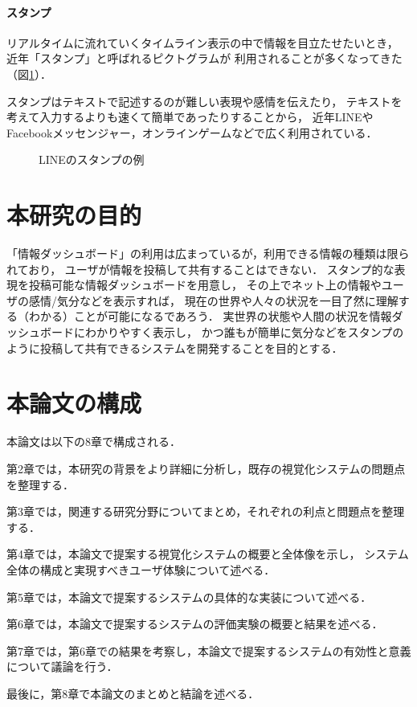 \vspace{2mm}
\paragraph*{スタンプ}

リアルタイムに流れていくタイムライン表示の中で情報を目立たせたいとき，
近年「スタンプ」と呼ばれるピクトグラムが
利用されることが多くなってきた（図\ref{linestamp}）．

スタンプはテキストで記述するのが難しい表現や感情を伝えたり，
テキストを考えて入力するよりも速くて簡単であったりすることから，
近年LINEやFacebookメッセンジャー，オンラインゲームなどで広く利用されている．

\begin{figure}[H]
\centering
{}
\caption{LINEのスタンプの例}
\label{linestamp}
\end{figure}

\section{本研究の目的}
「情報ダッシュボード」の利用は広まっているが，利用できる情報の種類は限られており，
ユーザが情報を投稿して共有することはできない．
スタンプ的な表現を投稿可能な情報ダッシュボードを用意し，
その上でネット上の情報やユーザの感情/気分などを表示すれば，
現在の世界や人々の状況を一目了然に理解する（わかる）ことが可能になるであろう．
実世界の状態や人間の状況を情報ダッシュボードにわかりやすく表示し，
かつ誰もが簡単に気分などをスタンプのように投稿して共有できるシステムを開発することを目的とする．

\section{本論文の構成}

本論文は以下の8章で構成される．

第2章では，本研究の背景をより詳細に分析し，既存の視覚化システムの問題点を整理する．

第3章では，関連する研究分野についてまとめ，それぞれの利点と問題点を整理する．

第4章では，本論文で提案する視覚化システムの概要と全体像を示し，
システム全体の構成と実現すべきユーザ体験について述べる．

第5章では，本論文で提案するシステムの具体的な実装について述べる．

第6章では，本論文で提案するシステムの評価実験の概要と結果を述べる．

第7章では，第6章での結果を考察し，本論文で提案するシステムの有効性と意義について議論を行う．

最後に，第8章で本論文のまとめと結論を述べる．